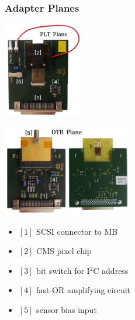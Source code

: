 \documentclass[9pt]{beamer}
\begin{document}
\begin{frame}
	\addtocounter{framenumber}{-1}
	\frametitle{Adapter Planes}
	\begin{center}
		\begin{minipage}{4cm}
			\centering
			\includegraphics[width=3.4cm]{Pics/AdapterAnalog}
		\end{minipage}
		\hspace*{2pt}
		\begin{minipage}{7cm}
			\centering
			\includegraphics[width=5.6cm]{Pics/AdapterDigital}
		\end{minipage}
	\end{center}
	\begin{center}
		\begin{minipage}{5.5cm}
			\begin{itemize}
				\item $[1]$ SCSI connector to MB
				\item $[2]$ CMS pixel chip
				\item $[3]$ bit switch for I$^{2}$C address
			\end{itemize}
		\end{minipage}
		\hspace*{2pt}
		\begin{minipage}{5.5cm}
			\begin{itemize}
				\item $[4]$ fast-OR amplifying circuit
				\item $[5]$ sensor bias input
			\end{itemize}
		\end{minipage}
	\end{center}
\end{frame}
\end{document}
